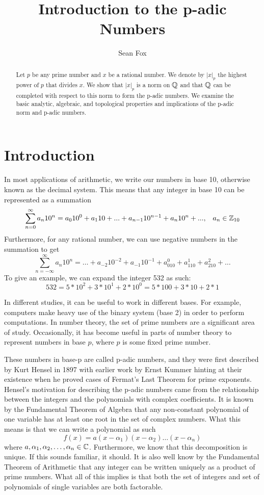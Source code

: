 \documentclass[a4paper]{article}
\title{Introduction to the p-adic Numbers}
\author{Sean Fox}
\begin{document}
\maketitle

\begin{abstract}
Let $p$ be any prime number and $x$ be a rational number.  
We denote by $|x|_p$ the highest power of $p$ that divides $x$.  We show
that $|x|_p$ is a norm on $\mathbb Q$ and that $\mathbb Q$ can be completed
with respect to this norm to form the p-adic numbers.  We examine the
basic analytic, algebraic, and topological properties and implications 
of the p-adic norm and p-adic numbers.
\end{abstract}
 
\section{Introduction}
\indent In most applications of arithmetic, we write our numbers in base 
10, otherwise known as the decimal system.  This means that any 
integer in base 10 can be represented as a summation
\[
	\sum_{n=0}^{\infty}a_n10^n=a_010^0+a_110+...+a_{n-1}
    10^{n-1}+a_n10^n+...,\;\;\;a_n\in\mathbb Z_{10}
\]
Furthermore, for any rational number, we can use negative numbers in
the summation to get
\[
	\sum_{n=-\infty}^{\infty}a_n10^n=\dots+a_{-2}10^{-2}+a_{-1}10^{-1}+
    a_010^0+a_110^1+a_210^2+\dots
\]
To give an example, we can expand the integer 532 as such:
\[
	532=5*10^2+3*10^1+2*10^0=5*100+3*10+2*1
\]

In different studies, it can be useful to work in different bases.  
For example, computers make heavy use of the binary system (base 
2) in order to perform computations. In number theory, the set of 
prime numbers are a significant area of study.  Occasionally, it 
has become useful in parts of number theory to represent numbers 
in base $p$, where $p$ is some fixed prime number.

These numbers in base-p are called p-adic numbers, and they were first 
described by Kurt Hensel in 1897 with earlier work by Ernst Kummer 
hinting at their existence when he proved cases of Fermat's Last 
Theorem for prime exponents.  Hensel's motivation for describing the 
p-adic numbers came from the relationship between the integers and the
polynomials with complex coefficients.  It is known by the Fundamental
Theorem of Algebra that any non-constant polynomial of one variable has 
at least one root in the set of complex numbers.  What this means is that
we can write a polynomial as such
\[
	f(x)=a(x-\alpha_1)(x-\alpha_2)\dots(x-\alpha_n)
\]
where $a,\alpha_1,\alpha_2,\dots,\alpha_n\in\mathbb C$.  Furthermore, we know 
that this decomposition is unique.  If this sounds familiar, it should.  
It is also well know by the Fundamental Theorem of Arithmetic that any 
integer can be written uniquely as a product of prime numbers.  What all of 
this implies is that both the set of integers and set of polynomials of 
single variables are both factorable.
\end{document}
